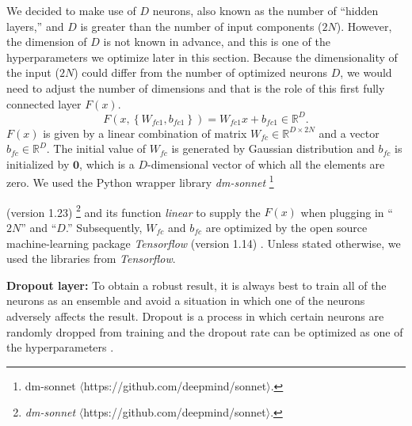 \documentclass[proof]{pasj01}
\providecommand{\DIFadd}[1]{{\protect\color{blue} \sf #1}} %
\providecommand{\DIFdel}[1]{{\protect\color{red} \scriptsize #1}} %
\providecommand{\DIFaddbegin}{\protect\color{blue}} %
\providecommand{\DIFaddend}{\protect\color{black}} %
\providecommand{\DIFdelbegin}{\protect\color{red}} %
\providecommand{\DIFdelend}{\protect\color{black}} %
\newcommand{\DIFscaledelfig}{0.5}
\newlength{\DIFdelgraphicswidth} %
\newlength{\DIFdelgraphicsheight} %
\newcommand{\DIFaddincludegraphics}[2][]{{\color{blue}\fbox{\DIFOincludegraphics[#1]{#2}}}} %
\newcommand{\DIFdelincludegraphics}[2][]{%
\sbox{\DIFdelgraphicsbox}{\DIFOincludegraphics[#1]{#2}}%
\settoboxwidth{\DIFdelgraphicswidth}{\DIFdelgraphicsbox} %
\settoboxtotalheight{\DIFdelgraphicsheight}{\DIFdelgraphicsbox} %
\scalebox{\DIFscaledelfig}{%
\parbox[b]{\DIFdelgraphicswidth}{\usebox{\DIFdelgraphicsbox}\\[-\baselineskip] \rule{\DIFdelgraphicswidth}{0em}}\llap{\resizebox{\DIFdelgraphicswidth}{\DIFdelgraphicsheight}{%
\setlength{\unitlength}{\DIFdelgraphicswidth}%
\begin{picture}(1,1)%
\thicklines\linethickness{2pt} %
{\color[rgb]{1,0,0}\put(0,0){\framebox(1,1){}}}%
{\color[rgb]{1,0,0}\put(0,0){\line( 1,1){1}}}%
{\color[rgb]{1,0,0}\put(0,1){\line(1,-1){1}}}%
\end{picture}%
}\hspace*{3pt}}} %
} %
\DeclareRobustCommand{\DIFaddbegin}{\DIFOaddbegin \let\includegraphics\DIFaddincludegraphics} %
\DeclareRobustCommand{\DIFaddend}{\DIFOaddend \let\includegraphics\DIFOincludegraphics} %
\DeclareRobustCommand{\DIFdelbegin}{\DIFOdelbegin \let\includegraphics\DIFdelincludegraphics} %
\DeclareRobustCommand{\DIFdelend}{\DIFOaddend \let\includegraphics\DIFOincludegraphics} %
\begin{document}
\DIFdelend {\bf First Fully Connected layer:}
We decided to make use of $D$ neurons, also known as the number of ``hidden layers,'' and $D$ is greater than the number of input components ($2N$). However, the dimension of $D$ is not known in advance, and this is one of the hyperparameters we optimize later in this section. Because the dimensionality of the input ($2N$) could differ from the number of optimized neurons $D$, we would need to adjust the number of dimensions and that is the role of this first fully connected layer $F(x)$.    
\begin{equation}
    F \left(x, \left\{W_{fc1},b_{fc1}\right\}\right) = W_{fc1} x + b_{fc1} \in \mathbb{R}^D.
\end{equation}
$F(x)$ is given by a linear combination of matrix $W_{fc} \in \mathbb{R}^{D\times 2N}$ and a vector $b_{fc} \in \mathbb{R}^D$. The initial value of $W_{fc}$ is generated by Gaussian distribution and $b_{fc}$ is initialized by $\mathbf{0}$, which is a $D$-dimensional vector of which all the elements are zero. We used the Python wrapper library {\it dm-sonnet} \DIFdelbegin \footnote{%
\DIFdel{dm-sonnet}%
\DIFdel{$\langle$https://github.com/deepmind/sonnet$\rangle$.}} %
\addtocounter{footnote}{-1}%
\DIFdelend (version 1.23)
\DIFaddbegin \footnote{{\it \DIFadd{dm-sonnet}} \DIFadd{$\langle$https://github.com/deepmind/sonnet$\rangle$.}}
\DIFaddend and its function {\it linear} to supply the $F(x)$ when plugging in ``$2N$'' and ``$D$.''  
Subsequently, $W_{fc}$ and $b_{fc}$ are optimized by the open source machine-learning package {\it Tensorflow} (version 1.14) \citep{Abadi2016}.  
Unless stated otherwise, we used the libraries from {\it Tensorflow}.

{\bf Dropout layer:}
To obtain a robust result, it is always best to train all of the neurons as an ensemble and avoid a situation in which one of the neurons adversely affects the result. Dropout is a process in which certain neurons are randomly dropped from training and the dropout rate can be optimized as one of the hyperparameters \citep{dropout}. 
\end{document}
